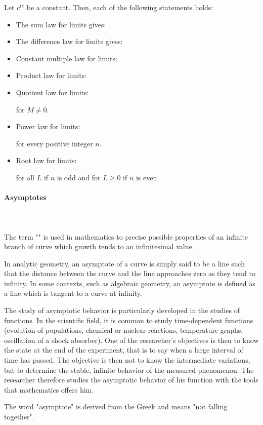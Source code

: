 	Let $c^{te}$ be a constant. Then, each of the following statements holds:		
	\begin{itemize}
		\item The sum law for limits gives:
		
		
		\item The difference law for limits gives:
		
		
		\item Constant multiple law for limits:
		
		
		\item Product law for limits:
		
		
		\item Quotient law for limits:
		
		for $M\neq 0$.
		
		\item Power law for limits:
		
		for every positive integer $n$.
		
		\item Root law for limits:
		
		for all $L$ if $n$ is odd and for $L\geq 0$ if $n$ is even.
	\end{itemize}
	
	\paragraph{Asymptotes}\mbox{}\\\\
	The term "" is used in mathematics to precise possible properties of an infinite branch of curve which growth tends to an infinitesimal value.
	
	In analytic geometry, an asymptote of a curve is simply said to be a line such that the distance between the curve and the line approaches zero as they tend to infinity. In some contexts, such as algebraic geometry, an asymptote is defined as a line which is tangent to a curve at infinity.
	
	The study of asymptotic behavior is particularly developed in the studies of functions. In the scientific field, it is common to study time-dependent functions (evolution of populations, chemical or nuclear reactions, temperature graphs, oscillation of a shock absorber). One of the researcher's objectives is then to know the state at the end of the experiment, that is to say when a large interval of time has passed. The objective is then not to know the intermediate variations, but to determine the stable, infinite behavior of the measured phenomenon. The researcher therefore studies the asymptotic behavior of his function with the tools that mathematics offers him.
	\begin{tcolorbox}[title=Remark,arc=10pt,breakable,drop lifted shadow,
  skin=enhanced,
  skin first is subskin of={enhancedfirst}{arc=10pt,no shadow},
  skin middle is subskin of={enhancedmiddle}{arc=10pt,no shadow},
  skin last is subskin of={enhancedlast}{drop lifted shadow}]
	The word "asymptote" is derived from the Greek and means "not falling together".
	\end{tcolorbox}	
	
